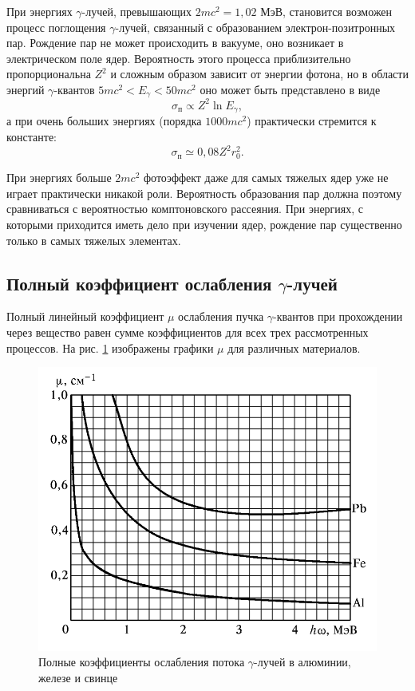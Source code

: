    При энергиях $\gamma$-лучей, превышающих $2 mc^2 = 1,02$ МэВ, становится возможен процесс поглощения $\gamma$-лучей, связанный с образованием электрон-позитронных пар. Рождение пар не может происходить в вакууме, оно возникает в электрическом поле ядер. Вероятность этого процесса приблизительно пропорциональна $Z^2$ и сложным образом зависит от энергии фотона, но в области энергий $\gamma$-квантов $5 mc^2 < E_{\gamma} < 50 mc^2$ оно может быть представлено в виде
    \begin{equation}
        \label{sigma_p}
	    \sigma_{\text{п}} \propto Z^2 \ln E_{\gamma},
	\end{equation}
    а при очень больших энергиях (порядка $1000 mc^2$) практически стремится к константе:
    \begin{equation}
        \label{sigma_p_2}
	    \sigma_{\text{п}} \simeq 0,08 Z^2 r_0^2.
	\end{equation}
    
    При энергиях больше $2mc^2 $ фотоэффект даже для самых тяжелых ядер уже не играет практически никакой роли. Вероятность образования пар должна поэтому сравниваться с вероятностью комптоновского рассеяния. При энергиях, с которыми приходится иметь дело при изучении ядер, рождение пар существенно только в самых тяжелых элементах.

\subsection*{Полный коэффициент ослабления $\gamma$-лучей}
	
	Полный линейный коэффициент $\mu$ ослабления пучка $\gamma$-квантов при прохождении через вещество равен сумме коэффициентов для всех трех рассмотренных процессов. На рис. \ref{full_coef} изображены графики $\mu$ для различных материалов.
	
	\begin{figure}[h!]
		\centering
		\includegraphics[width = 11 cm]{images/full_coef}
		\caption{Полные коэффициенты ослабления потока $\gamma$-лучей в алюминии, железе и свинце}
		\label{full_coef}
	\end{figure}

